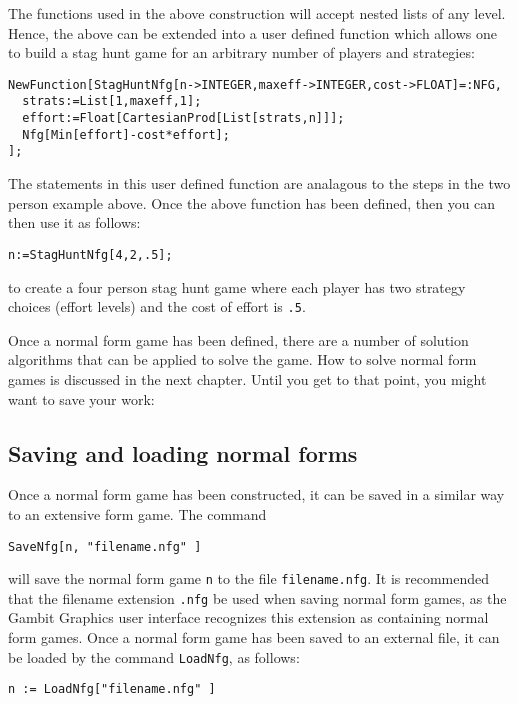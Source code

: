 The functions used in the above construction will accept nested lists
of any level.  Hence, the above can be extended into a user defined
function which allows one to build a stag hunt game for an arbitrary
number of players and strategies:

\begin{verbatim}
NewFunction[StagHuntNfg[n->INTEGER,maxeff->INTEGER,cost->FLOAT]=:NFG,
  strats:=List[1,maxeff,1];
  effort:=Float[CartesianProd[List[strats,n]]];
  Nfg[Min[effort]-cost*effort];
];
\end{verbatim}

\noindent
The statements in this user defined function are analagous to the
steps in the two person example above.  Once the above function has
been defined, then you can then use it as follows:

\begin{verbatim}
n:=StagHuntNfg[4,2,.5];
\end{verbatim}

\noindent
to create a four person stag hunt game where each player has two
strategy choices (effort levels) and the cost of effort is \verb+.5+.

Once a normal form game has been defined, there are a number of
solution algorithms that can be applied to solve the game.  How to
solve normal form games is discussed in the next chapter.  Until you
get to that point, you might want to save your work:

\subsection{Saving and loading normal forms}

Once a normal form game has been constructed, it can be saved in a
similar way to an extensive form game.  The command 

\begin{verbatim}
SaveNfg[n, "filename.nfg" ]
\end{verbatim}

\noindent
will save the normal form game \verb+n+ to the file
\verb+filename.nfg+.  It is recommended that the filename extension
\verb+.nfg+ be used when saving normal form games, as the Gambit
Graphics user interface recognizes this extension as containing normal
form games.  Once a normal form game has been saved to an external
file, it can be loaded by the command \verb+LoadNfg+, as follows:

\begin{verbatim}
n := LoadNfg["filename.nfg" ]
\end{verbatim}



